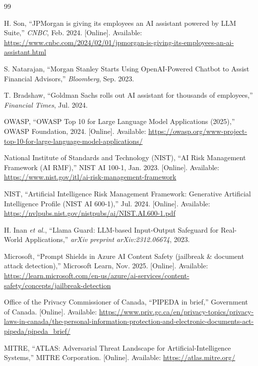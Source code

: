 \documentclass[journal]{IEEEtran}
\begin{document}
\begin{thebibliography}{99}

H. Son, ``JPMorgan is giving its employees an AI assistant powered by LLM Suite,'' \textit{CNBC}, Feb. 2024. [Online]. Available: \url{https://www.cnbc.com/2024/02/01/jpmorgan-is-giving-its-employees-an-ai-assistant.html}

S. Natarajan, ``Morgan Stanley Starts Using OpenAI-Powered Chatbot to Assist Financial Advisors,'' \textit{Bloomberg}, Sep. 2023.

T. Bradshaw, ``Goldman Sachs rolls out AI assistant for thousands of employees,'' \textit{Financial Times}, Jul. 2024.

OWASP, ``OWASP Top 10 for Large Language Model Applications (2025),'' OWASP Foundation, 2024. [Online]. Available: \url{https://owasp.org/www-project-top-10-for-large-language-model-applications/}

National Institute of Standards and Technology (NIST), ``AI Risk Management Framework (AI RMF),'' NIST AI 100-1, Jan. 2023. [Online]. Available: \url{https://www.nist.gov/itl/ai-risk-management-framework}

NIST, ``Artificial Intelligence Risk Management Framework: Generative Artificial Intelligence Profile (NIST AI 600-1),'' Jul. 2024. [Online]. Available: \url{https://nvlpubs.nist.gov/nistpubs/ai/NIST.AI.600-1.pdf}

H. Inan \textit{et al.}, ``Llama Guard: LLM-based Input-Output Safeguard for Real-World Applications,'' \textit{arXiv preprint arXiv:2312.06674}, 2023.

Microsoft, ``Prompt Shields in Azure AI Content Safety (jailbreak \& document attack detection),'' Microsoft Learn, Nov. 2025. [Online]. Available: \url{https://learn.microsoft.com/en-us/azure/ai-services/content-safety/concepts/jailbreak-detection}

Office of the Privacy Commissioner of Canada, ``PIPEDA in brief,'' Government of Canada. [Online]. Available: \url{https://www.priv.gc.ca/en/privacy-topics/privacy-laws-in-canada/the-personal-information-protection-and-electronic-documents-act-pipeda/pipeda_brief/}

MITRE, ``ATLAS: Adversarial Threat Landscape for Artificial-Intelligence Systems,'' MITRE Corporation. [Online]. Available: \url{https://atlas.mitre.org/}


\end{thebibliography}
\end{document}
